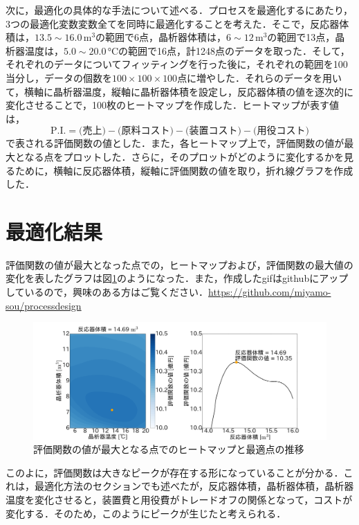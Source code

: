 次に，最適化の具体的な手法について述べる．プロセスを最適化するにあたり，3つの最適化変数変数全てを同時に最適化することを考えた．そこで，反応器体積は，$13.5 \sim 16.0 \, \si{\cubic \metre}$の範囲で6点，晶析器体積は，$6 \sim 12 \, \si{\cubic \metre}$の範囲で13点，晶析器温度は，$5.0 \sim 20.0 \, \si{\degreeCelsius}$の範囲で16点，計1248点のデータを取った．そして，それぞれのデータについてフィッティングを行った後に，それぞれの範囲を100当分し，データの個数を$100 \times 100 \times 100$点に増やした．それらのデータを用いて，横軸に晶析器温度，縦軸に晶析器体積を設定し，反応器体積の値を逐次的に変化させることで，100枚のヒートマップを作成した．ヒートマップが表す値は，
\begin{equation}
  \text{P.I.} = \text{(売上)} - \text{(原料コスト)} - \text{(装置コスト)} -\text{(用役コスト)}
\end{equation}
で表される評価関数の値とした．また，各ヒートマップ上で，評価関数の値が最大となる点をプロットした．さらに，そのプロットがどのように変化するかを見るために，横軸に反応器体積，縦軸に評価関数の値を取り，折れ線グラフを作成した．

\section{最適化結果}
評価関数の値が最大となった点での，ヒートマップおよび，評価関数の最大値の変化を表したグラフは図\ref{最適化結果}のようになった．また，作成したgifはgithubにアップしているので，興味のある方はご覧ください．\url{https://github.com/miyamo-sou/processdesign}
\begin{figure}[htbp]
    \label{最適化結果}
    \begin{center}
        \includegraphics[scale=0.1]{snapshot.png}
        \caption{評価関数の値が最大となる点でのヒートマップと最適点の推移}
    \end{center}
\end{figure}

このよに，評価関数は大きなピークが存在する形になっていることが分かる．これは，最適化方法のセクションでも述べたが，反応器体積，晶析器体積，晶析器温度を変化させると，装置費と用役費がトレードオフの関係となって，コストが変化する．そのため，このようにピークが生じたと考えられる．


